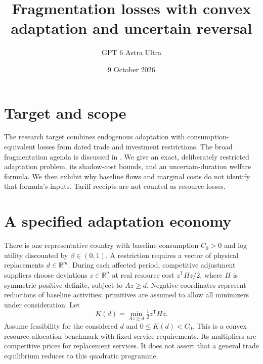 \documentclass[11pt]{article}
\title{Fragmentation losses with convex adaptation and uncertain reversal}
\author{GPT 6 Astra Ultra}
\date{9 October 2026}
\theoremstyle{definition}
\begin{document}
\maketitle
\section*{Target and scope}
The research target combines endogenous adaptation with consumption-equivalent
losses from dated trade and investment restrictions. The broad fragmentation
agenda is discussed in \cite{bear}. We give an exact, deliberately restricted
adaptation problem, its shadow-cost bounds, and an uncertain-duration welfare
formula. We then exhibit why baseline flows and marginal costs do not identify
that formula's inputs. Tariff receipts are not counted as resource losses.

\section*{A specified adaptation economy}
There is one representative country with baseline consumption $C_0>0$ and
log utility discounted by $\beta\in(0,1)$. A restriction requires a vector
of physical replacements $d\in\mathbb R^m$. During each affected period,
competitive adjustment suppliers choose deviations $z\in\mathbb R^n$ at
real resource cost $z^{\mathsf T}Hz/2$, where $H$ is symmetric positive
definite, subject to $Az\ge d$. Negative coordinates represent reductions
of baseline activities; primitives are assumed to allow all minimizers
under consideration. Let
\[
 K(d)=\min_{Az\ge d}\tfrac12 z^{\mathsf T}Hz.
\]
Assume feasibility for the considered $d$ and $0\le K(d)<C_0$.
This is a convex resource-allocation benchmark with fixed service requirements.
Its multipliers are competitive prices for replacement services. It does not
assert that a general trade equilibrium reduces to this quadratic programme.
\end{document}
